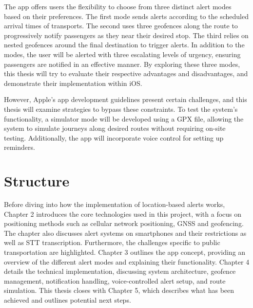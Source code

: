 The app offers users the flexibility to choose from three distinct alert modes based on their preferences. The first mode sends alerts according to the scheduled arrival times of transports. The second uses three geofences along the route to progressively notify passengers as they near their desired stop. The third relies on nested geofences around the final destination to trigger alerts. In addition to the modes, the user will be alerted with three escalating levels of urgency, ensuring passengers are notified in an effective manner. By exploring these three modes, this thesis will try to evaluate their respective advantages and disadvantages, and demonstrate their implementation within iOS. 

However, Apple's app development guidelines present certain challenges, and this thesis will examine strategies to bypass these constraints. To test the system's functionality, a simulator mode will be developed using a GPX file, allowing the system to simulate journeys along desired routes without requiring on-site testing. Additionally, the app will incorporate voice control for setting up reminders.

\section{Structure} %
Before diving into how the implementation of location-based alerts works, Chapter 2 introduces the core technologies used in this project, with a focus on positioning methods such as cellular network positioning, \ac{GNSS} and geofencing. The chapter also discusses alert systems on smartphones and their restrictions as well as \ac{STT} transcription. Furthermore, the challenges specific to public transportation are highlighted. Chapter 3 outlines the app concept, providing an overview of the different alert modes and explaining their functionality. Chapter 4 details the technical implementation, discussing system architecture, geofence management, notification handling, voice-controlled alert setup, and route simulation. This thesis closes with Chapter 5, which describes what has been achieved and outlines potential next steps.